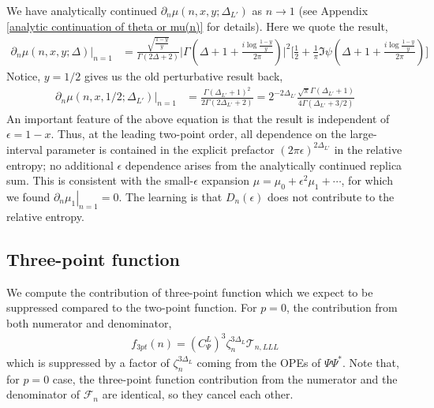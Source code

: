 \documentclass[11pt]{article}
\newcommand{\ep}{\epsilon}
\newcommand{\p}{\partial}
\newcommand{\lb}{\left(}
\newcommand{\rb}{\right)}
\begin{document}
We have analytically continued  $\p_n\mu(n,x,y;\Delta_{L'})$ as $n\to 1$ (see Appendix \ref{analytic continuation of theta or mu(n)} for details). Here we quote the result,
\begin{align}
    \label{eq:general-y-mu-continuation}
    \p_n\mu(n,x,y;\Delta)|_{n=1} &=\frac{\sqrt{\frac{1-y}{y}}}{\Gamma(2\Delta +2)} \Bigg|\Gamma\lb \Delta + 1 +\frac{i\log \frac{1-y}{y}}{2\pi}\rb\Bigg|^2\Bigg[\frac{1}{2}+ \frac{1}{\pi} \Im \psi\lb\Delta + 1 + \frac{i\log \frac{1-y}{y}}{2\pi}\rb\Bigg]
\end{align}
Notice, $y=1/2$ gives us the old perturbative result back, 
\begin{align}
    \p_n\mu(n,x,1/2;\Delta_{L'})|_{n=1} &= \frac{\Gamma(\Delta_{L'}+1)^2}{2\Gamma(2\Delta_{L'} +2)} = 2^{-2\Delta_{L'}}\frac{\sqrt \pi \Gamma(\Delta_{L'}+1)}{4\Gamma(\Delta_{L'}+3/2)}
\end{align}
An important feature of the above equation is that
the result is independent of $\epsilon=1-x$. Thus, at the leading
two-point order, all dependence on the large-interval parameter is
contained in the explicit prefactor
$(2\pi\epsilon)^{2\Delta_{L'}}$ in the relative entropy; no additional
$\epsilon$ dependence arises from the analytically continued replica sum.
This is consistent with the small-$\epsilon$ expansion
$\mu=\mu_0+\epsilon^2\mu_1+\cdots$, for which we found
$\left.\partial_n\mu_1\right|_{n=1}=0$. The learning is that $D_n(\ep)$ does not contribute to the relative entropy. 

\subsection{Three-point function}
We compute the contribution of three-point function which we expect to be suppressed compared to the two-point function. 
For $p=0$, the contribution from both numerator and denominator,
\begin{align}
    f_{3pt}(n) = {(C_\Psi^L)}^3 \zeta_n^{3\Delta_L} \mathcal{T}_{n,LLL} 
\end{align}
which is suppressed by a factor of $\zeta_n^{3\Delta_L}$ coming from the OPEs of $\Psi \Psi^*$.
Note that, for $p=0$ case, the three-point function contribution from the numerator and the denominator of $\mathcal{F}_n$ are identical, so they cancel each other.
\end{document}
